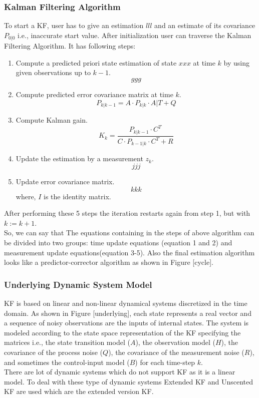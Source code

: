 \subsubsection{Kalman Filtering Algorithm}
To start a KF, user has to give an estimation $lll$ and an estimate of its covariance $P_{0|0}$ i.e., inaccurate start value. After initialization user can traverse the Kalman Filtering Algorithm. It has following steps\cite{Wilfried2002}:
\begin{enumerate}
  \item  Compute a predicted priori state estimation of state $xxx$ at time $k$ by using given observations up to $k-1$.
  $$ggg$$
  \item Compute predicted error covariance matrix at time $k$.
  $$P_{k|k-1} = A \cdot P_{k|k} \cdot A|{T} + Q$$
  \item Compute Kalman gain.
  $$K_{k} = \frac{P_{k|k-1} \cdot C^{T}}{C \cdot P_{k-1|k} \cdot C^{T} + R}$$
  \item Update the estimation by a measurement $z_{k}$.
  $$jjj$$
  \item Update error covariance matrix.
  $$kkk$$
  where, $I$ is the identity matrix.
\end{enumerate}

After performing these 5 steps the iteration restarts again from step 1, but with $k:=k+1$.\\
So, we can say that The equations containing in the steps of above algorithm can be divided into two groups: time update equations (equation 1 and 2) and measurement update equations(equation 3-5)\cite{bishop2001introduction}. Also the final estimation algorithm looks like  a predictor-corrector algorithm as shown in Figure [cycle].

\subsubsection{Underlying Dynamic System Model}
KF is based on linear and non-linear dynamical systems discretized in the time domain\cite{bishop2001introduction}. As shown in Figure [underlying], each state represents a real vector and a sequence of noisy observations are the inputs of internal states. The system is modeled according to the state space representation of the KF specifying the matrices i.e., the state transition model ($A$), the observation model ($H$), the covariance of the process noise ($Q$), the covariance of the measurement noise ($R$), and sometimes the control-input model ($B$) for each time-step $k$.\\
There are lot of dynamic systems which do not support KF as it is a linear model\cite{aich2010study}. To deal with these type of dynamic systems Extended KF and Unscented KF are used which are the extended version KF\cite{aich2010study}.